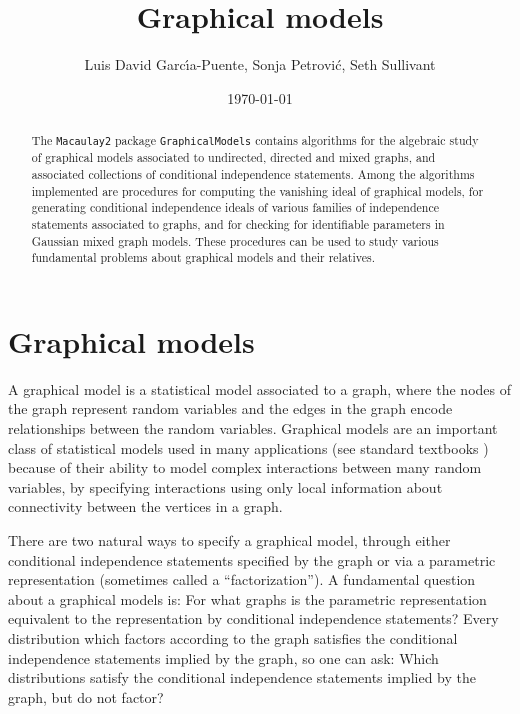 \documentclass[letterpaper]{article}
\title{Graphical models}
\author{Luis David Garc\'{\i}a-Puente, Sonja Petrovi\'c, Seth Sullivant}
\date{\today}
\theoremstyle{definition}
\begin{document}
\maketitle
\begin{abstract}
The {\tt Macaulay2} package {\tt GraphicalModels} contains algorithms 
for the algebraic study of graphical models associated to undirected, 
directed and mixed graphs, 
and associated collections of 
conditional independence statements. 
Among the algorithms implemented are procedures for computing
the vanishing ideal of graphical models, for generating
conditional independence ideals of various families of independence statements
associated to graphs, and for checking for identifiable parameters
in Gaussian mixed graph models.
These procedures can be used to study various fundamental 
problems about graphical models and their relatives. 
\end{abstract}


\section{Graphical models}\label{intro}

A graphical model is a statistical model associated to a graph,
where the nodes of the graph represent random variables and the
edges in the graph encode relationships between the random variables.
Graphical models are an important class of statistical models used
in many applications (see standard textbooks \cite{Lauritzen, Whitaker})
because of their ability to model complex interactions between
many random variables, by specifying
interactions using only local information about connectivity
between the vertices in a graph.

There are two natural ways to specify a graphical model, through 
either conditional independence statements specified by the graph
or via a parametric representation (sometimes called a ``factorization'').
A fundamental question about a graphical models is: For what
graphs is the parametric representation equivalent to the
representation by conditional independence statements?
Every distribution which factors according to the graph
satisfies the conditional independence statements implied by the 
graph, so one can ask:  Which distributions satisfy the conditional
independence statements implied by the graph, but do not factor?
\end{document}
